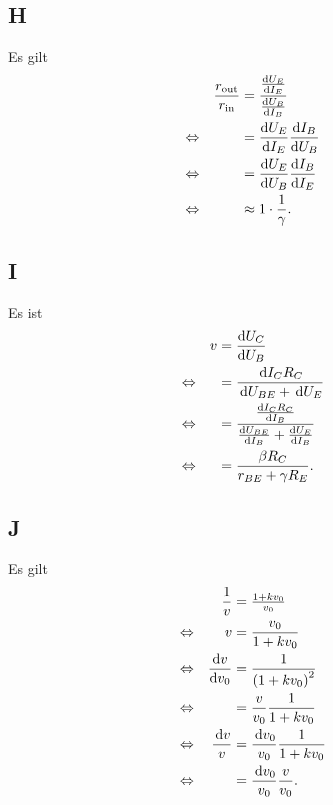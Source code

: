 \documentclass[a4paper,10pt]{article}
\newcommand{\td}{\,\text{d}}
\numberwithin{equation}{section}
\begin{document}
\begin{multicols}{2}
	\subsection{H}
	Es gilt
	\begin{align}
		                &  & \dfrac{r_\text{out}}{r_\text{in}} & = \dfrac{\diff[]{U_E}{I_E}}{\diff[]{U_B}{I_B}} &  &           \\
		\Leftrightarrow &  &                                   & = \diff[]{U_E}{I_E}\diff[]{I_B}{U_B}           &  & \nonumber \\
		\Leftrightarrow &  &                                   & = \diff[]{U_E}{U_B}\diff[]{I_B}{I_E}           &  & \nonumber \\
		\Leftrightarrow &  &                                   & \approx 1\cdot \dfrac{1}{\gamma }.             &  &
	\end{align}

	\subsection{I}
	Es ist
	\begin{align}
		                &  & v & = \diff[]{U_C}{U_B}                                                    &  &           \\
		\Leftrightarrow &  &   & = \dfrac{\td I_CR_C}{\td U_{BE}+\td U_E}                               &  & \nonumber \\
		\Leftrightarrow &  &   & = \dfrac{\diff[]{I_CR_C}{I_B}}{\diff[]{U_{BE}}{I_B}+\diff[]{U_E}{I_B}} &  & \nonumber \\
		\Leftrightarrow &  &   & = \dfrac{\beta R_C}{r_{BE}+\gamma R_E}.                                &  &
	\end{align}

	\subsection{J}
	Es gilt
	\begin{align}
		                &  & \dfrac{1}{v}     & = \tfrac{1+kv_0}{v_0}                   &  &           \\
		\Leftrightarrow &  & v                & = \dfrac{v_0}{1+kv_0}                   &  & \nonumber \\
		\Leftrightarrow &  & \diff[]{v}{v_0}  & = \dfrac{1}{\left(1+kv_0\right)^2}      &  & \nonumber \\
		\Leftrightarrow &  &                  & = \dfrac{v}{v_0}\dfrac{1}{1+kv_0}       &  & \nonumber \\
		\Leftrightarrow &  & \dfrac{\td v}{v} & = \dfrac{\td v_0}{v_0}\dfrac{1}{1+kv_0} &  & \nonumber \\
		\Leftrightarrow &  &                  & = \dfrac{\td v_0}{v_0}\dfrac{v}{v_0}.   &  &
	\end{align}


\end{multicols}
\end{document}
